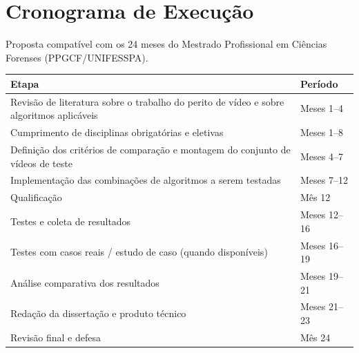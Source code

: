 \section*{Cronograma de Execução}

Proposta compatível com os 24 meses do Mestrado Profissional em Ciências Forenses (PPGCF/UNIFESSPA).

\begin{center}
\begin{longtable}{p{10.5cm}p{3cm}}
\toprule
\textbf{Etapa} & \textbf{Período} \\
\midrule
\endhead
Revisão de literatura sobre o trabalho do perito de vídeo e sobre algoritmos aplicáveis & Meses 1--4 \\
Cumprimento de disciplinas obrigatórias e eletivas & Meses 1--8 \\
Definição dos critérios de comparação e montagem do conjunto de vídeos de teste & Meses 4--7 \\
Implementação das combinações de algoritmos a serem testadas & Meses 7--12 \\
Qualificação & Mês 12 \\
Testes e coleta de resultados & Meses 12--16 \\
Testes com casos reais / estudo de caso (quando disponíveis) & Meses 16--19 \\
Análise comparativa dos resultados & Meses 19--21 \\
Redação da dissertação e produto técnico & Meses 21--23 \\
Revisão final e defesa & Mês 24 \\
\bottomrule
\end{longtable}
\end{center}
